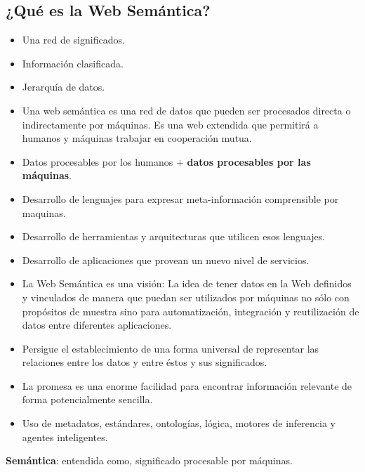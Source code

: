 \documentclass[a4paper,12pt,twoside,final,spanish]{article}
\begin{document}
\subsection{¿Qué es la Web Semántica?}

\begin{itemize}
\item Una red de significados.

\item Información clasificada.

\item Jerarquía de datos.

\item Una web semántica es una red de datos que pueden ser procesados directa o indirectamente por máquinas. Es una web extendida que permitirá a humanos y máquinas trabajar en cooperación mutua.

\item Datos procesables por los humanos + \textbf{datos procesables por las máquinas}.

\item Desarrollo de lenguajes para expresar meta-información comprensible por maquinas.

\item Desarrollo de herramientas y arquitecturas que utilicen esos lenguajes.

\item Desarrollo de aplicaciones que provean un nuevo nivel de servicios.

\item La Web Semántica es una visión: La idea de tener datos en la Web definidos y vinculados de manera que puedan ser utilizados por máquinas no sólo con propósitos de muestra sino para automatización, integración y reutilización de datos entre diferentes aplicaciones.

\item Persigue el establecimiento de una forma universal de representar las relaciones  entre los datos y entre éstos y sus significados.

\item La promesa es una enorme facilidad para encontrar información relevante de forma  potencialmente sencilla.

\item Uso de metadatos, estándares, ontologías, lógica, motores de inferencia y agentes inteligentes.
\end{itemize}

\textbf{Semántica}: entendida como, significado procesable por máquinas.
\end{document}
